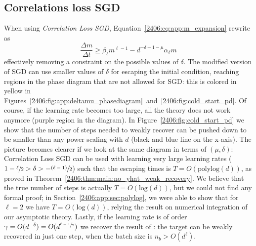 \subsection{Correlations loss SGD}
When using \emph{Correlation Loss SGD}, Equation~\eqref{2406:eq:app:m_expansion} rewrite as 
\[
    \frac{\Delta m}{\Delta t} \ge \beta_\ell m^{\ell-1} %
        -d^{-\delta+1-\mu}\alpha_\ell m
\]
effectively removing a constraint on the possible values of \(\delta\). The modified version of SGD can use smaller values of \(\delta\) for escaping the initial condition, reaching regions in the phase diagram that are not allowed for SGD: this is colored in yellow in Figures~\ref{2406:fig:app:deltamu_phasediagram}~and~\ref{2406:fig:cold_start_pd}. Of course, if the learning rate becomes too large, all the theory does not work anymore (purple region in the diagram). In Figure~\ref{2406:fig:cold_start_pd} we show that the number of steps needed to weakly recover can be pushed down to be smaller than any power scaling with \(d\) (black and blue line on the x-axis). The picture becomes clearer if we look at the same diagram in terms of \((\mu,\delta)\): Correlation Loss SGD can be used with learning very large learning rates (\(1-\sfrac\ell2>\delta>-\sfrac{(\ell-1)}{2}\)) such that the escaping times is \(T=O(\mathrm{polylog}(d))\), as proved in Theorem~\ref{2406:thm:main:no_yhat_weak_recovery}.
We believe that the true number of steps is actually \(T=O(\mathrm{log}(d))\), but we could not find any formal proof; in Section~\ref{2406:app:sec:polylog}, we were able to show that for \(\ell=2\) we have \(T=O(\mathrm{log}(d))\), relying the result on numerical integration of our asymptotic theory. Lastly, if the learning rate is of order \(\gamma=O(d^{-\delta})=O(d^{\sfrac{\ell-1}{2}})\) we recover the result of \cite{dandi2023how}: the target can be weakly recovered in just one step, when the batch size is \(n_b>O(d^\ell)\).

